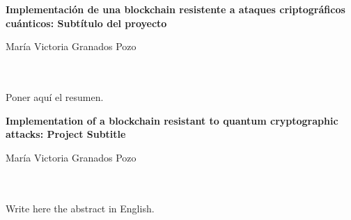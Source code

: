 \chapter*{}






\cleardoublepage
\thispagestyle{empty}

\begin{center}
{\large\bfseries Implementación de una blockchain resistente a ataques criptográficos cuánticos: Subtítulo del proyecto}\\
\end{center}
\begin{center}
María Victoria Granados Pozo\\
\end{center}

\\

\vspace{0.7cm}
\\

Poner aquí el resumen.
\cleardoublepage


\thispagestyle{empty}


\begin{center}
{\large\bfseries Implementation of a blockchain resistant to quantum cryptographic attacks: Project Subtitle}\\
\end{center}
\begin{center}
María Victoria Granados Pozo\\
\end{center}

\\

\vspace{0.7cm}
\\

Write here the abstract in English.

\chapter*{}
\thispagestyle{empty}

